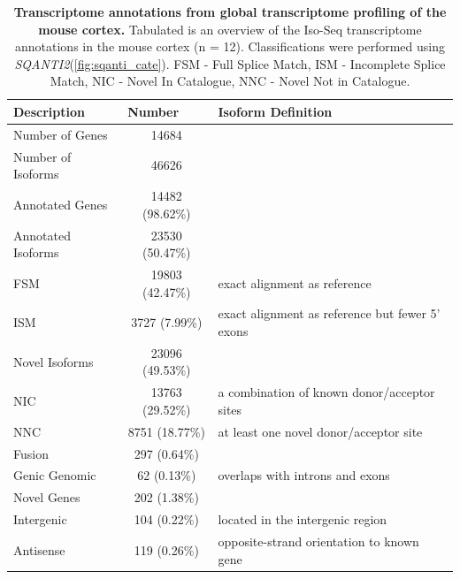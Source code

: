 \vspace{0.7cm}
\begin{table}[!h]
	\caption[Transcriptome annotations from global transcriptome profiling]%
	{\textbf{Transcriptome annotations from global transcriptome profiling of the mouse cortex.} Tabulated is an overview of the Iso-Seq transcriptome annotations in the mouse cortex (n = 12). Classifications were performed using \textit{SQANTI2}(\cref{fig:sqanti_cate}). FSM - Full Splice Match, ISM - Incomplete Splice Match, NIC - Novel In Catalogue, NNC - Novel Not in Catalogue. }
	\label{tab:sqanti_output_whole}
	\begin{tabularx}{1\textwidth}{lcl}
		\toprule
		Description              & \multicolumn{1}{l}{Number} & Isoform Definition               \\ \midrule
		Number of Genes    & 14684                      &                                  \\
		Number of Isoforms & 46626                      &                                  \\
		Annotated Genes          & 14482 (98.62\%)            &                                  \\
		\hspace{3mm}Annotated Isoforms       & 23530 (50.47\%)            &                                  \\
		\hspace{6mm}FSM          & 19803 (42.47\%) & exact alignment as reference  \\
		\hspace{6mm}ISM  & 3727 (7.99\%)   & exact alignment as reference but fewer 5’ exons       \\
		\hspace{3mm}Novel Isoforms           & 23096 (49.53\%)            &                                  \\
		\hspace{6mm}NIC      & 13763 (29.52\%) & a combination of known donor/acceptor sites                    \\
		\hspace{6mm}NNC   & 8751 (18.77\%)  & at least one novel donor/acceptor site    \\
		\hspace{6mm}Fusion                   & 297 (0.64\%)               &                                  \\
		\hspace{6mm}Genic Genomic            & 62 (0.13\%)                & overlaps with introns and exons  \\
		Novel Genes              & 202 (1.38\%)               &                                  \\
		\hspace{6mm}Intergenic               & 104 (0.22\%)               & located in the intergenic region \\
		\hspace{6mm}Antisense                     & 119 (0.26\%)    & opposite-strand orientation to known gene           \\ \bottomrule
	\end{tabularx}
\end{table}

